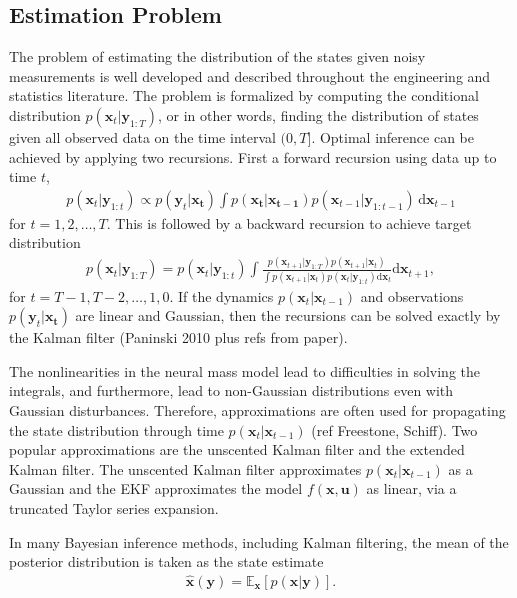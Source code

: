 \documentclass{article}
\begin{document}
\subsection{Estimation Problem}
The problem of estimating the distribution of the states given noisy measurements is well developed and described throughout the engineering and statistics literature. The problem is formalized by computing the conditional distribution $p\left(\mathbf{x}_t | \mathbf{y}_{1:T}\right)$, or in other words, finding the distribution of states given all observed data on the time interval $(0, T]$. Optimal inference can be achieved by applying two recursions. First a forward recursion using data up to time $t$,
\begin{align}
	p\left(\mathbf{x}_t | \mathbf{y}_{1:t}\right) \propto p(\mathbf{y}_t|\mathbf{x_t})\int p(\mathbf{x_t}|\mathbf{x_{t-1}})p(\mathbf{x}_{t-1}|\mathbf{y}_{1:t-1}) \, \mathrm{d}\mathbf{x}_{t-1}
\end{align}
for $t = 1,2,\hdots,T$. This is followed by a backward recursion to achieve target distribution
\begin{align}
	p\left(\mathbf{x}_t | \mathbf{y}_{1:T}\right) = p\left(\mathbf{x}_t | \mathbf{y}_{1:t}\right) \int \frac{p\left(\mathbf{x}_{t+1} | \mathbf{y}_{1:T}\right) p\left(\mathbf{x}_{t+1} | \mathbf{x}_{t}\right) }{\int p\left(\mathbf{x}_{t+1} | \mathbf{x}_{t}\right) p\left(\mathbf{x}_{t} | \mathbf{y}_{1:t}\right) \mathrm{d}\mathbf{x}_{t} } \mathrm{d}\mathbf{x}_{t+1},
\end{align}
for $t = T-1,T-2,\hdots,1,0$. If the dynamics $p(\mathbf{x}_t | \mathbf{x}_{t-1})$ and observations $p(\mathbf{y}_t| \mathbf{x_t})$ are linear and Gaussian, then the recursions can be solved exactly by the Kalman filter (Paninski 2010 plus refs from paper). 

The nonlinearities in the neural mass model lead to difficulties in solving the integrals, and furthermore, lead to non-Gaussian distributions even with Gaussian disturbances. Therefore, approximations are often used for propagating the state distribution through time $p(\mathbf{x}_t | \mathbf{x}_{t-1})$ (ref Freestone, Schiff). Two popular approximations are the unscented Kalman filter and the extended Kalman filter. The unscented Kalman filter approximates $p(\mathbf{x}_t | \mathbf{x}_{t-1})$ as a Gaussian and the EKF approximates the model $f(\mathbf{x},\mathbf{u})$ as linear, via a truncated Taylor series expansion. 

In many Bayesian inference methods, including Kalman filtering, the mean of the posterior distribution is taken as the state estimate
\begin{align}
	\hat{\mathbf{x}}\left(\mathbf{y}\right) = \mathbb{E}_\mathbf{x}\left[p\left(\mathbf{x}|\mathbf{y}\right)\right].
\end{align}
\end{document}
